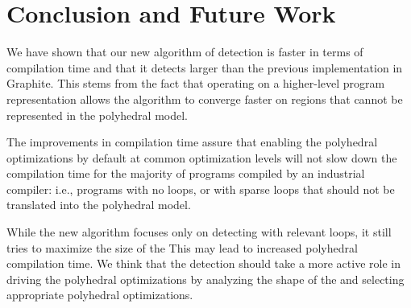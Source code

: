 \documentclass{sig-alternate}
\begin{document}
\begin{table}[h!]
  \begin{center}
  \end{center}
  \caption{Overall number of instructions spent in \SCoP{} detection.}
  \label{tab:overall-insns}
\end{table}

\section{Conclusion and Future Work}
We have shown that our new algorithm of \SCoP{} detection is faster in terms of
compilation time and that it detects larger  than the previous
implementation in Graphite.  This stems from the fact that operating on a
higher-level program representation allows the algorithm to converge faster on
regions that cannot be represented in the polyhedral model.

The improvements in compilation time assure that enabling the polyhedral
optimizations by default at common optimization levels will not slow down the
compilation time for the majority of programs compiled by an industrial
compiler: i.e., programs with no loops, or with sparse loops that should not be
translated into the polyhedral model.

While the new algorithm focuses only on detecting  with relevant loops,
it still tries to maximize the size of the   This may lead to increased
polyhedral compilation time.  We think that the \SCoP{} detection should take a
more active role in driving the polyhedral optimizations by analyzing the shape
of the  and selecting appropriate polyhedral optimizations.
\end{document}
